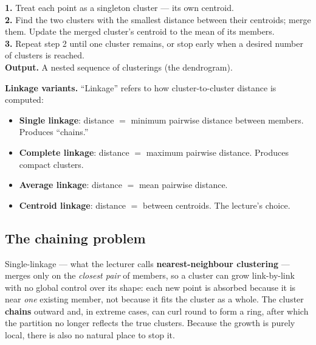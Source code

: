 \documentclass[11pt, a4paper]{article}
\begin{document}
\begin{exbox}
\textbf{1.} Treat each point as a singleton cluster — its own centroid.\\[0.2em]
\textbf{2.} Find the two clusters with the smallest distance between their centroids; merge them. Update the merged cluster's centroid to the mean of its members.\\[0.2em]
\textbf{3.} Repeat step 2 until one cluster remains, or stop early when a desired number of clusters is reached.\\[0.2em]
\textbf{Output.} A nested sequence of clusterings (the dendrogram).
\end{exbox}

\textbf{Linkage variants.} ``Linkage'' refers to how cluster-to-cluster distance is computed:
\begin{itemize}
  \item \textbf{Single linkage}: distance $=$ minimum pairwise distance between members. Produces ``chains.''
  \item \textbf{Complete linkage}: distance $=$ maximum pairwise distance. Produces compact clusters.
  \item \textbf{Average linkage}: distance $=$ mean pairwise distance.
  \item \textbf{Centroid linkage}: distance $=$ between centroids. The lecture's choice.
\end{itemize}

\subsection{The chaining problem}

\begin{pitfallbox}
Single-linkage — what the lecturer calls \textbf{nearest-neighbour clustering} — merges only on the \emph{closest pair} of members, so a cluster can grow link-by-link with no global control over its shape: each new point is absorbed because it is near \emph{one} existing member, not because it fits the cluster as a whole. The cluster \textbf{chains} outward and, in extreme cases, can curl round to form a ring, after which the partition no longer reflects the true clusters. Because the growth is purely local, there is also no natural place to stop it.
\end{pitfallbox}
\end{document}
